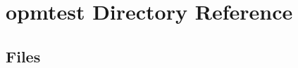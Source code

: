 \section{opmtest Directory Reference}
\label{dir_9894da4b8730c40fe68f89751085f4da}
\subsection*{Files}
\begin{DoxyCompactItemize}
\end{DoxyCompactItemize}
